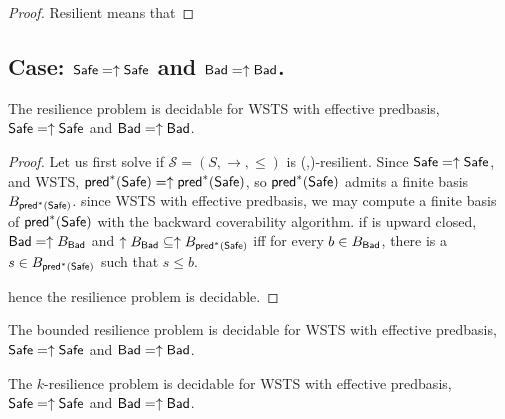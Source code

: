 \begin{proof}
Resilient means that 
\end{proof}


\subsection{Case: $\textsf{Safe}=\uparrow \textsf{Safe}$ and $\textsf{Bad}=\uparrow \textsf{Bad}$.}


\begin{theorem}\label{up-up}
The %
resilience problem is decidable for WSTS with effective predbasis, $\textsf{Safe}=\uparrow \textsf{Safe}$
and $\textsf{Bad}=\uparrow \textsf{Bad}$.
\end{theorem}


\begin{proof}
Let us first solve if $\mathscr{S}=(S,\rightarrow,\leq)$ is %
(\Bad,\Safe)-resilient. Since $\textsf{Safe}=\uparrow \textsf{Safe}$, and WSTS, $\textsf{pred}^*(\textsf{Safe})=\uparrow \textsf{pred}^*(\textsf{Safe})$, so $\textsf{pred}^*(\textsf{Safe})$ admits a finite basis $B_{\textsf{pred}^*(\textsf{Safe})}$. since WSTS  with effective predbasis, we may compute a finite basis of $\textsf{pred}^*(\textsf{Safe})$ with the backward coverability algorithm. 
if \Bad  is upward closed, $\textsf{Bad} = \uparrow B_{\textsf{Bad}}$ and $ \uparrow B_{\textsf{Bad}} \subseteq \uparrow B_{\textsf{pred}^*(\textsf{Safe})}$ iff for every $b \in B_{\textsf{Bad}}$, there is a $s \in B_{\textsf{pred}^*(\textsf{Safe})}$ such that $s \leq b$. 
\iffalse
similar reasonning for the other case.
\fi
hence the %
 resilience problem is decidable.
\end{proof}

\begin{corollary}
The bounded resilience problem is decidable for WSTS with effective predbasis, $\textsf{Safe}=\uparrow \textsf{Safe}$
and $\textsf{Bad}=\uparrow \textsf{Bad}$.
\end{corollary}


\begin{theorem}\label{up-up}
The %
$k$-resilience problem is decidable for WSTS with effective predbasis, $\textsf{Safe}=\uparrow \textsf{Safe}$
and $\textsf{Bad}=\uparrow \textsf{Bad}$.
\end{theorem}

